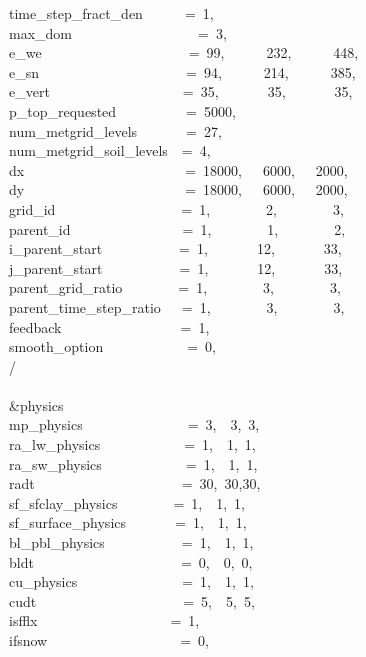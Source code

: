 time\_step\_fract\_den~~~~~~=~1,\\
max\_dom~~~~~~~~~~~~~~~~~~=~3,\\
e\_we~~~~~~~~~~~~~~~~~~~~~=~99,~~~~~~232,~~~~~~448,\\
e\_sn~~~~~~~~~~~~~~~~~~~~~=~94,~~~~~~214,~~~~~~385,\\
e\_vert~~~~~~~~~~~~~~~~~~~=~35,~~~~~~~35,~~~~~~~35,\\
p\_top\_requested~~~~~~~~~~=~5000,\\
num\_metgrid\_levels~~~~~~~=~27,\\
num\_metgrid\_soil\_levels~~=~4,\\
dx~~~~~~~~~~~~~~~~~~~~~~~=~18000,~~~6000,~~~2000,\\
dy~~~~~~~~~~~~~~~~~~~~~~~=~18000,~~~6000,~~~2000,\\
grid\_id~~~~~~~~~~~~~~~~~~=~1,~~~~~~~~2,~~~~~~~~3,\\
parent\_id~~~~~~~~~~~~~~~~=~1,~~~~~~~~1,~~~~~~~~2,\\
i\_parent\_start~~~~~~~~~~~=~1,~~~~~~~12,~~~~~~~33,\\
j\_parent\_start~~~~~~~~~~~=~1,~~~~~~~12,~~~~~~~33,\\
parent\_grid\_ratio~~~~~~~~=~1,~~~~~~~~3,~~~~~~~~3,\\
parent\_time\_step\_ratio~~~=~1,~~~~~~~~3,~~~~~~~~3,\\
feedback~~~~~~~~~~~~~~~~~=~1,\\
smooth\_option~~~~~~~~~~~~=~0,\\
/\\
\\
\&physics~~~~~~~~~~~~~~~~~\\
mp\_physics~~~~~~~~~~~~~~~=~3,~~3,~3,~\\
ra\_lw\_physics~~~~~~~~~~~~=~1,~~1,~1,~\\
ra\_sw\_physics~~~~~~~~~~~~=~1,~~1,~1,~\\
radt~~~~~~~~~~~~~~~~~~~~~=~30,~30,30,\\
sf\_sfclay\_physics~~~~~~~~=~1,~~1,~1,~\\
sf\_surface\_physics~~~~~~~=~1,~~1,~1,~\\
bl\_pbl\_physics~~~~~~~~~~~=~1,~~1,~1,~\\
bldt~~~~~~~~~~~~~~~~~~~~~=~0,~~0,~0,~\\
cu\_physics~~~~~~~~~~~~~~~=~1,~~1,~1,~\\
cudt~~~~~~~~~~~~~~~~~~~~~=~5,~~5,~5,~\\
isfflx~~~~~~~~~~~~~~~~~~~=~1,\\
ifsnow~~~~~~~~~~~~~~~~~~~=~0,\\
